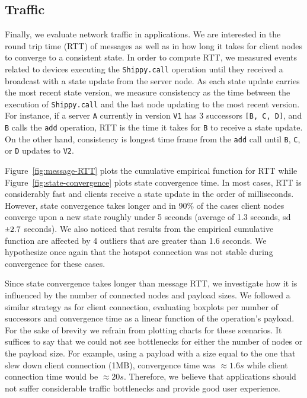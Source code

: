 \subsection{Traffic}
\label{sub:eval:traffic}

Finally, we evaluate network traffic in \APIshort applications.
We are interested in the round trip time (RTT) of messages as well as in how long it takes for client nodes to converge to a consistent state.
In order to compute RTT, we measured events related to devices executing the \texttt{Shippy.call} operation until they received a broadcast with a state update from the server node.
As each state update carries the most recent state version, we measure consistency as the time between the execution of \texttt{Shippy.call} and the last node updating to the most recent version.
For instance, if a server \texttt{A} currently in version \texttt{V1} has 3 successors \texttt{[B, C, D]}, and \texttt{B} calls the \texttt{add} operation, RTT is the time it takes for \texttt{B} to receive a state update.
On the other hand, consistency is longest time frame from the \texttt{add} call until \texttt{B}, \texttt{C}, or \texttt{D} updates to \texttt{V2}.


Figure~\ref{fig:message-RTT} plots the cumulative empirical function for RTT while Figure~\ref{fig:state-convergence} plots state convergence time.
In most cases, RTT is considerably fast and clients receive a state update in the order of milliseconds.
However, state convergence takes longer and in 90\% of the cases client nodes converge upon a new state roughly under 5 seconds (average of 1.3 seconds, sd $\rpm 2.7$ seconds).
We also noticed that results from the empirical cumulative function are affected by 4 outliers that are greater than 1.6 seconds. We hypothesize once again that the hotspot connection was not stable during convergence for these cases. 


Since state convergence takes longer than message RTT, we investigate how it is influenced by the number of connected nodes and payload sizes.
We followed a similar strategy as for client connection, evaluating boxplots per number of successors and convergence time as a linear function of the operation's payload.
For the sake of brevity we refrain from plotting charts for these scenarios.
It suffices to say that we could not see bottlenecks for either the number of nodes or the payload size. 
For example, using a payload with a size equal to the one that slew down client connection (1MB), convergence time was $\approx 1.6s$ while client connection time would be $\approx 20s$.
Therefore, we believe that \APIshort applications should not suffer considerable traffic bottlenecks and provide good user experience. 


